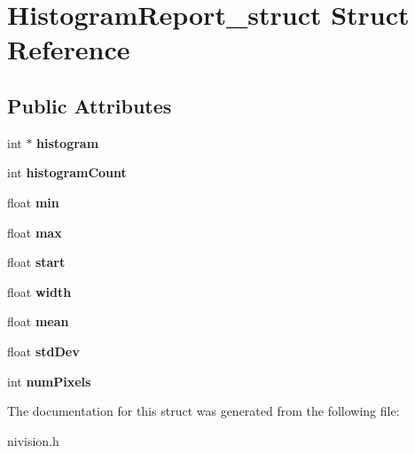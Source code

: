 \hypertarget{structHistogramReport__struct}{\section{\-Histogram\-Report\-\_\-struct \-Struct \-Reference}
\label{structHistogramReport__struct}
}
\subsection*{\-Public \-Attributes}
\begin{DoxyCompactItemize}
\item 
\hypertarget{structHistogramReport__struct_ae2a4bf5d013fd23c97f233f84931e893}{int $\ast$ {\bfseries histogram}}\label{structHistogramReport__struct_ae2a4bf5d013fd23c97f233f84931e893}

\item 
\hypertarget{structHistogramReport__struct_ace3f10c53c0849be0325f1d0f49c5cc6}{int {\bfseries histogram\-Count}}\label{structHistogramReport__struct_ace3f10c53c0849be0325f1d0f49c5cc6}

\item 
\hypertarget{structHistogramReport__struct_a84095698e5025567b7ead3f24aaa4609}{float {\bfseries min}}\label{structHistogramReport__struct_a84095698e5025567b7ead3f24aaa4609}

\item 
\hypertarget{structHistogramReport__struct_ad191015ac357d25c621ccd55dc9d6fdf}{float {\bfseries max}}\label{structHistogramReport__struct_ad191015ac357d25c621ccd55dc9d6fdf}

\item 
\hypertarget{structHistogramReport__struct_a430a855ce6a66cdc970ba492fbdf628f}{float {\bfseries start}}\label{structHistogramReport__struct_a430a855ce6a66cdc970ba492fbdf628f}

\item 
\hypertarget{structHistogramReport__struct_af360a28be8c996e2a604951a96001639}{float {\bfseries width}}\label{structHistogramReport__struct_af360a28be8c996e2a604951a96001639}

\item 
\hypertarget{structHistogramReport__struct_a25e94f1123c2ca708dbbe0f60cc82c16}{float {\bfseries mean}}\label{structHistogramReport__struct_a25e94f1123c2ca708dbbe0f60cc82c16}

\item 
\hypertarget{structHistogramReport__struct_a21713b863832a106b287fa38ab9b4d9e}{float {\bfseries std\-Dev}}\label{structHistogramReport__struct_a21713b863832a106b287fa38ab9b4d9e}

\item 
\hypertarget{structHistogramReport__struct_a37769eeb9ea1153271817e5bc4b942c3}{int {\bfseries num\-Pixels}}\label{structHistogramReport__struct_a37769eeb9ea1153271817e5bc4b942c3}

\end{DoxyCompactItemize}


\-The documentation for this struct was generated from the following file\-:\begin{DoxyCompactItemize}
\item 
nivision.\-h\end{DoxyCompactItemize}
